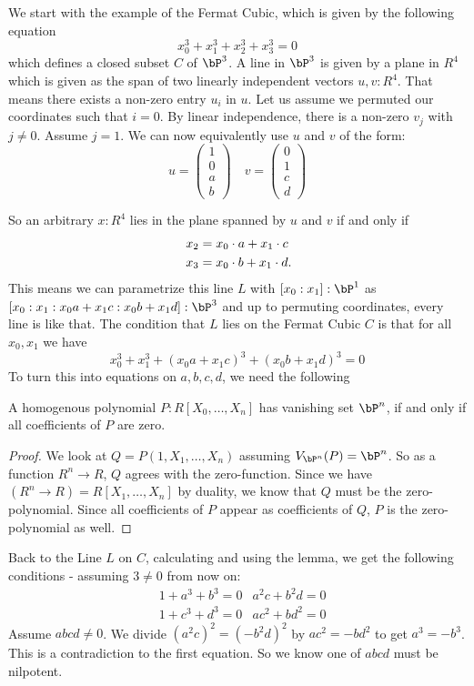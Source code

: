 We start with the example of the Fermat Cubic, which is given by the following equation
\[
  x_0^3+x_1^3+x_2^3+x_3^3=0
\]
which defines a closed subset $C$ of $\bP^3$.
A line in $\bP^3$ is given by a plane in $R^4$ which is given as the span of two linearly independent vectors $u,v:R^4$.
That means there exists a non-zero entry $u_i$ in $u$.
Let us assume we permuted our coordinates such that $i=0$.
By linear independence, there is a non-zero $v_j$ with $j\neq 0$. Assume $j=1$.
We can now equivalently use $u$ and $v$ of the form:
\[
u=\left(\begin{array}{c} 1 \\ 0 \\ a \\ b \end{array}\right)\quad
v=\left(\begin{array}{c} 0 \\ 1 \\ c \\ d \end{array}\right)
\]

So an arbitrary $x:R^4$ lies in the plane spanned by $u$ and $v$ if and only if
\begin{align*}
  x_2&=x_0\cdot a+x_1\cdot c \\
  x_3&=x_0\cdot b+x_1\cdot d\rlap{.}
\end{align*}
This means we can parametrize this line $L$ with $[x_0:x_1]:\bP^1$
as $[x_0:x_1:x_0 a+x_1 c:x_0 b+x_1 d]:\bP^3$ and up to permuting coordinates, every line is like that.
The condition that $L$ lies on the Fermat Cubic $C$ is that for all $x_0,x_1$ we have
\[
  x_0^3+x_1^3+(x_0 a+x_1 c)^3+(x_0 b+x_1 d)^3=0
\]
To turn this into equations on $a,b,c,d$, we need the following

\begin{lemma}
  A homogenous polynomial $P:R[X_0,\dots,X_n]$ has vanishing set $\bP^n$,
  if and only if all coefficients of $P$ are zero.
\end{lemma}

\begin{proof}
  We look at $Q=P(1,X_1,\dots,X_n)$ assuming $V_{\bP^n}(P)=\bP^n$.
  So as a function $R^n\to R$, $Q$ agrees with the zero-function.
  Since we have $(R^n\to R)=R[X_1,\dots,X_n]$ by duality, we know that $Q$ must be the zero-polynomial.
  Since all coefficients of $P$ appear as coefficients of $Q$, $P$ is the zero-polynomial as well.
\end{proof}
Back to the Line $L$ on $C$, calculating and using the lemma, we get the following conditions - assuming $3\neq 0$ from now on:
\begin{align*}
  &1+a^3+b^3=0 &a^2c+b^2d=0 \\
  &1+c^3+d^3=0 &ac^2+bd^2=0
\end{align*}
Assume $abcd\neq 0$. We divide $(a^2c)^2=(-b^2d)^2$ by $ac^2=-bd^2$ to get $a^3=-b^3$.
This is a contradiction to the first equation. So we know one of $abcd$ must be nilpotent.


